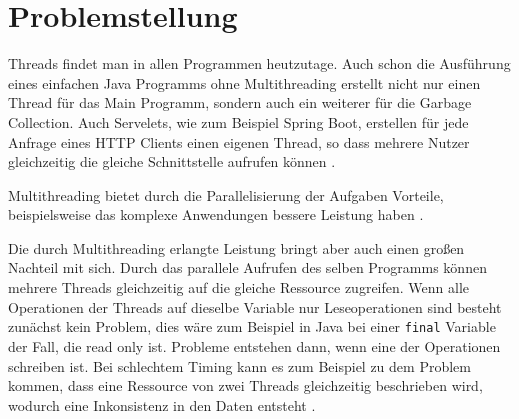 \section{Problemstellung}

Threads findet man in allen Programmen heutzutage. Auch schon die Ausführung eines einfachen Java Programms ohne Multithreading erstellt nicht nur einen Thread für das Main Programm, sondern auch ein weiterer für die Garbage Collection. Auch Servelets, wie zum Beispiel Spring Boot, erstellen für jede Anfrage eines HTTP Clients einen eigenen Thread, so dass mehrere Nutzer gleichzeitig die gleiche Schnittstelle aufrufen können \cite[vgl.][8]{brian}.

Multithreading bietet durch die Parallelisierung der Aufgaben Vorteile, beispielsweise das komplexe Anwendungen bessere Leistung haben \cite[vgl.][3]{brian}. 

Die durch Multithreading erlangte Leistung bringt aber auch einen großen Nachteil mit sich. Durch das parallele Aufrufen des selben Programms können mehrere Threads gleichzeitig auf die gleiche Ressource zugreifen. Wenn alle Operationen der Threads auf dieselbe Variable nur Leseoperationen sind besteht zunächst kein Problem, dies wäre zum Beispiel in Java  bei einer \texttt{final} Variable der Fall, die read only ist. Probleme entstehen dann, wenn eine der Operationen schreiben ist. Bei schlechtem Timing kann es zum Beispiel zu dem Problem kommen, dass eine Ressource von zwei Threads gleichzeitig beschrieben wird, wodurch eine Inkonsistenz in den Daten entsteht \cite[vgl.][11-15]{brian}.      